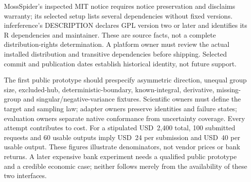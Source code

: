 MossSpider's inspected MIT notice requires notice preservation and disclaims
warranty; its selected setup lists several dependencies without fixed versions.
inferference's DESCRIPTION declares GPL version two or later and identifies its
R dependencies and maintainer. These are source facts, not a complete
distribution-rights determination. A platform owner must review the actual
installed distribution and transitive dependencies before shipping. Selected
commit and publication dates establish historical identity, not future support.
\citep{exec24_interference_mossspider,exec24_interference_inferference}

The first public prototype should prespecify asymmetric direction, unequal
group size, excluded-hub, deterministic-boundary, known-integral, derivative,
missing-group and singular/negative-variance fixtures. Scientific owners must
define the target and sampling law; adapter owners preserve identities and
failure states; evaluation owners separate native conformance from uncertainty
coverage. Every attempt contributes to cost. For a stipulated USD~2,400 total,
100 submitted requests and 60 usable outputs imply USD~24 per submission and
USD~40 per usable output. These figures illustrate denominators, not vendor
prices or bank returns. A later expensive bank experiment needs a qualified
public prototype and a credible economic case; neither follows merely from
the availability of these two interfaces.
\citep{exec24_interference_reference}
